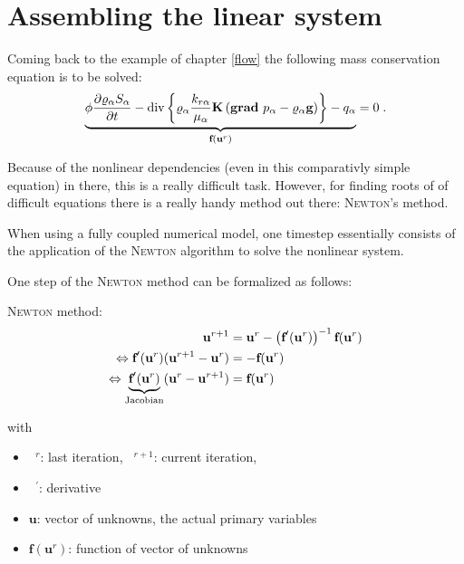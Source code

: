 \section{Assembling the linear system}
\label{sc_linearsystem}

Coming back to the example of chapter \ref{flow} the following mass conservation
equation is to be solved:
\begin{align}
\underbrace{
  \phi \frac{\partial \varrho_\alpha S_\alpha}{\partial t}
 -
 \text{div} \left\{
 \varrho_\alpha \frac{k_{r\alpha}}{\mu_\alpha} \mbox{\bf K}
 \left(\operatorname{\bf grad}\, p_\alpha - \varrho_{\alpha} \mbox{\bf g} \right)
 \right\} - q_\alpha} _
{\textbf{f}(\textbf{u}^r)}
= 0 \; .
\end{align}

Because of the nonlinear dependencies (even in this comparativly simple equation)
in there, this is a really difficult task. However, for finding roots of of
difficult equations there is a really handy method out there: \textsc{Newton}'s method.

When using a fully coupled numerical model, one timestep essentially consists
of the application of the \textsc{Newton} algorithm to solve the nonlinear system.

One step of the \textsc{Newton} method can be formalized as follows:

\textsc{Newton} method:
\begin{subequations}
\begin{align}
\label{NewtonGen}
\textbf{u}^{r+1} &= \textbf{u}^r -  \left(\textbf{f}^\prime (\textbf{u}^r) \right)^{-1} \textbf{f}(\textbf{u}^r) \\
\Leftrightarrow {\textbf{f}^{\prime}(\textbf{u}^r)}  ( \textbf{u}^{r+1}-\textbf{u}^r) &= -\textbf{f}(\textbf{u}^r) \\
\Leftrightarrow \underbrace{\textbf{f}^{\prime}(\textbf{u}^r)}_{\textnormal{Jacobian}}
                ( \textbf{u}^r - \textbf{u}^{r+1}) &= \textbf{f}(\textbf{u}^r) \label{NewtonAsUsed}
\end{align}
\end{subequations}

\noindent with
\begin{itemize}
\item $\phantom{a}^r$: last iteration, $\phantom{a}^{r+1}$: current iteration,
\item $\phantom{a}^\prime$: derivative
\item $\textbf{u}$: vector of unknowns, the actual primary variables
\item $\textbf{f}(\textbf{u}^r)$: function of vector of unknowns
\end{itemize}

